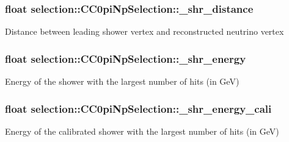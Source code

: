 \subsubsection[{\texorpdfstring{\+\_\+shr\+\_\+distance}{_shr_distance}}]{\setlength{\rightskip}{0pt plus 5cm}float selection\+::\+C\+C0pi\+Np\+Selection\+::\+\_\+shr\+\_\+distance\hspace{0.3cm}{\ttfamily [private]}}\hypertarget{classselection_1_1CC0piNpSelection_a20705dc212e16009a0ce4ace27d54af7}{}\label{classselection_1_1CC0piNpSelection_a20705dc212e16009a0ce4ace27d54af7}
Distance between leading shower vertex and reconstructed neutrino vertex 
\subsubsection[{\texorpdfstring{\+\_\+shr\+\_\+energy}{_shr_energy}}]{\setlength{\rightskip}{0pt plus 5cm}float selection\+::\+C\+C0pi\+Np\+Selection\+::\+\_\+shr\+\_\+energy\hspace{0.3cm}{\ttfamily [private]}}\hypertarget{classselection_1_1CC0piNpSelection_abf854f061d0476dc08ae8b3d71e7a86d}{}\label{classselection_1_1CC0piNpSelection_abf854f061d0476dc08ae8b3d71e7a86d}
Energy of the shower with the largest number of hits (in GeV) 
\subsubsection[{\texorpdfstring{\+\_\+shr\+\_\+energy\+\_\+cali}{_shr_energy_cali}}]{\setlength{\rightskip}{0pt plus 5cm}float selection\+::\+C\+C0pi\+Np\+Selection\+::\+\_\+shr\+\_\+energy\+\_\+cali\hspace{0.3cm}{\ttfamily [private]}}\hypertarget{classselection_1_1CC0piNpSelection_a910f18dc66ac2f22aa8cbdd6b86c7d0e}{}\label{classselection_1_1CC0piNpSelection_a910f18dc66ac2f22aa8cbdd6b86c7d0e}
Energy of the calibrated shower with the largest number of hits (in GeV) 
